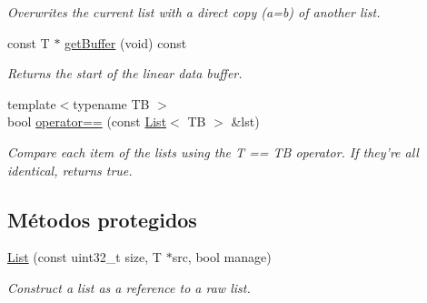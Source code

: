 \begin{DoxyCompactItemize}
\begin{DoxyCompactList}\small\item\em \-Overwrites the current list with a direct copy (a=b) of another list. \end{DoxyCompactList}\item 
\hypertarget{classxsens_1_1List_a034198cd62b195aa52cafe1f75e49a4f}{const \-T $\ast$ \hyperlink{classxsens_1_1List_a034198cd62b195aa52cafe1f75e49a4f}{get\-Buffer} (void) const }\label{classxsens_1_1List_a034198cd62b195aa52cafe1f75e49a4f}

\begin{DoxyCompactList}\small\item\em \-Returns the start of the linear data buffer. \end{DoxyCompactList}\item 
\hypertarget{classxsens_1_1List_a26f1255ce8efa3fc957b3565b2a9ac81}{{\footnotesize template$<$typename T\-B $>$ }\\bool \hyperlink{classxsens_1_1List_a26f1255ce8efa3fc957b3565b2a9ac81}{operator==} (const \hyperlink{classxsens_1_1List}{\-List}$<$ \-T\-B $>$ \&lst)}\label{classxsens_1_1List_a26f1255ce8efa3fc957b3565b2a9ac81}

\begin{DoxyCompactList}\small\item\em \-Compare each item of the lists using the \-T == \-T\-B operator. \-If they're all identical, returns true. \end{DoxyCompactList}\end{DoxyCompactItemize}
\subsection*{\-Métodos protegidos}
\begin{DoxyCompactItemize}
\item 
\hypertarget{classxsens_1_1List_aa585a7809c71c72413695411a3a9569f}{\hyperlink{classxsens_1_1List_aa585a7809c71c72413695411a3a9569f}{\-List} (const uint32\-\_\-t size, \-T $\ast$src, bool manage)}\label{classxsens_1_1List_aa585a7809c71c72413695411a3a9569f}

\begin{DoxyCompactList}\small\item\em \-Construct a list as a reference to a raw list. \end{DoxyCompactList}\end{DoxyCompactItemize}
